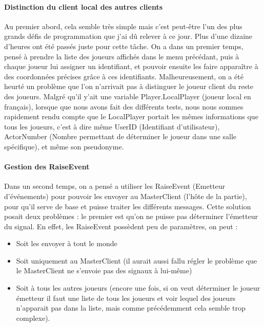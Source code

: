 \documentclass{article}
\begin{document}
\paragraph{Distinction du client local des autres clients}

Au premier abord, cela semble très simple mais c'est peut-être l'un des plus grands défis de programmation que j'ai dû relever à ce jour. Plus d'une dizaine d'heures ont été passés juste pour cette tâche.
On a dans un premier temps, pensé à prendre la liste des joueurs affichés dans le menu précédant, puis à chaque joueur lui assigner un identifiant, et pouvoir ensuite les faire apparaître à des coordonnées précises grâce à ces identifiants. Malheureusement, on a été heurté un problème que l’on n’arrivait pas à distinguer le joueur client du reste des joueurs. Malgré qu'il y'ait une variable Player.LocalPlayer (joueur local en français), lorsque que nous avons fait des différents tests, nous nous sommes rapidement rendu compte que le LocalPlayer portait les mêmes informations que tous les joueurs, c'est à dire même UserID (Identifiant d'utilisateur), ActorNumber (Nombre permettant de déterminer le joueur dans une salle spécifique), et même son pseudonyme. 

\newpage
\paragraph{Gestion des RaiseEvent}

Dans un second temps, on a pensé a utiliser les RaiseEvent (Emetteur d'événements) pour pouvoir les envoyer au MasterClient (l'hôte de la partie), pour qu'il serve de base et puisse traiter les différents messages. Cette solution posait deux problèmes : le premier est qu'on ne puisse pas déterminer l'émetteur du signal. En effet, les RaiseEvent possèdent peu de paramètres, on peut :


\begin{itemize}
\item Soit les envoyer à tout le monde
\item Soit uniquement au MasterClient (il aurait aussi fallu régler le problème que le MasterClient ne s'envoie pas des signaux à lui-même)
\item Soit à tous les autres joueurs (encore une fois, si on veut déterminer le joueur émetteur il faut une liste de tous les joueurs et voir lequel des joueurs n'apparait pas dans la liste, mais comme précédemment cela semble trop complexe). 
\end{itemize}
\end{document}
